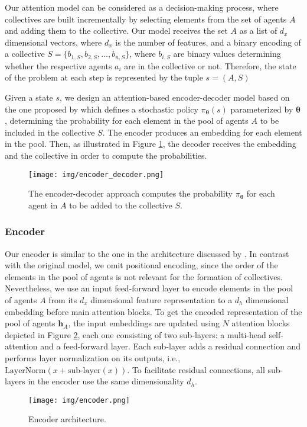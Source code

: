 \documentclass{article}
\theoremstyle{definition}
\begin{document}
Our attention model can be considered as a decision-making process, where collectives are built incrementally by selecting elements from the set of agents $A$ and adding them to the collective. Our model receives the set $A$ as a list of $d_x$ dimensional vectors, where $d_x$ is the number of features, and a binary encoding of a collective $S = \{b_{1,S}, b_{2,S}, \ldots, b_{n,S}\}$, where $b_{i,S}$ are binary values determining whether the respective agents $a_i$ are in the collective or not. Therefore, the state of the problem at each step is represented by the tuple $s = (A, S)$

Given a state $s$, we design an attention-based encoder-decoder model based on the one proposed by \cite{vaswani2017attention} which defines a stochastic policy $\pi_{\boldsymbol{\theta}}(s)$ parameterized by $\boldsymbol{\theta}$, determining the probability for each element in the pool of agents $A$ to be included in the collective $S$. The encoder produces an embedding for each element in the pool. Then, as illustrated in Figure \ref{encoder_decoder}, the decoder receives the embedding and the collective in order to compute the probabilities.

\begin{figure}[ht]
    \centering
    \texttt{[image: img/encoder\_decoder.png]}
    \caption{The encoder-decoder approach computes the probability $\pi_{\boldsymbol{\theta}}$ for each agent in $A$ to be added to the collective $S$.}
    \label{encoder_decoder}
\end{figure}

\subsubsection{Encoder}

Our encoder is similar to the one in the architecture discussed by \cite{vaswani2017attention}.
In contrast with the original model, we omit positional encoding, since the order of the elements in the pool of agents is not relevant for the formation of collectives. Nevertheless, we use an input feed-forward layer to encode elements in the pool of agents $A$ from its $d_x$ dimensional feature representation to a $d_h$ dimensional embedding before main attention blocks.
To get the encoded representation of the pool of agents $\boldsymbol{h}_{A}$, the input embeddings are updated using $N$ attention blocks depicted in Figure \ref{encoder}, each one consisting of two sub-layers: a multi-head self-attention and a feed-forward layer. Each sub-layer adds a residual connection \cite{he2016deep} and performs layer normalization \cite{ba2016layer} on its outputs, i.e., $\text{LayerNorm}(x + \text{sub-layer}(x))$. To facilitate residual connections, all sub-layers in the encoder use the same dimensionality $d_h$.
\begin{figure}[ht]
    \centering
    \texttt{[image: img/encoder.png]}
    \caption{Encoder architecture.}
    \label{encoder}
\end{figure}
\end{document}
